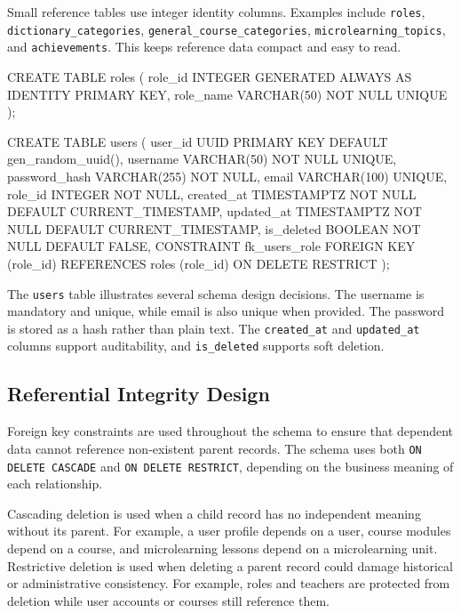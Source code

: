 Small reference tables use integer identity columns. Examples include \texttt{roles}, \texttt{dictionary\_categories}, \texttt{general\_course\_categories}, \texttt{microlearning\_topics}, and \texttt{achievements}. This keeps reference data compact and easy to read.

\begin{sqlcode}[caption={Representative identifier definitions},label={lst:ddl-identifier-examples}]
CREATE TABLE roles (
    role_id INTEGER GENERATED ALWAYS AS IDENTITY PRIMARY KEY,
    role_name VARCHAR(50) NOT NULL UNIQUE
);

CREATE TABLE users (
    user_id UUID PRIMARY KEY DEFAULT gen_random_uuid(),
    username VARCHAR(50) NOT NULL UNIQUE,
    password_hash VARCHAR(255) NOT NULL,
    email VARCHAR(100) UNIQUE,
    role_id INTEGER NOT NULL,
    created_at TIMESTAMPTZ NOT NULL DEFAULT CURRENT_TIMESTAMP,
    updated_at TIMESTAMPTZ NOT NULL DEFAULT CURRENT_TIMESTAMP,
    is_deleted BOOLEAN NOT NULL DEFAULT FALSE,
    CONSTRAINT fk_users_role
        FOREIGN KEY (role_id)
        REFERENCES roles (role_id)
        ON DELETE RESTRICT
);
\end{sqlcode}

The \texttt{users} table illustrates several schema design decisions. The username is mandatory and unique, while email is also unique when provided. The password is stored as a hash rather than plain text. The \texttt{created\_at} and \texttt{updated\_at} columns support auditability, and \texttt{is\_deleted} supports soft deletion.

\subsection{Referential Integrity Design}

Foreign key constraints are used throughout the schema to ensure that dependent data cannot reference non-existent parent records. The schema uses both \texttt{ON DELETE CASCADE} and \texttt{ON DELETE RESTRICT}, depending on the business meaning of each relationship.

Cascading deletion is used when a child record has no independent meaning without its parent. For example, a user profile depends on a user, course modules depend on a course, and microlearning lessons depend on a microlearning unit. Restrictive deletion is used when deleting a parent record could damage historical or administrative consistency. For example, roles and teachers are protected from deletion while user accounts or courses still reference them.

